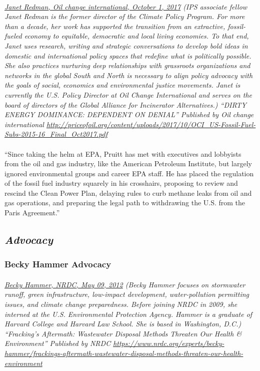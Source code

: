 \documentclass{article}
\begin{document}
\paragraph{}
\small
\textit{
\underline{Janet Redman, Oil change international, October 1, 2017}
(IPS associate fellow Janet Redman is the former director of the Climate Policy Program. For more than a decade, her work has supported the transition from an extractive, fossil-fueled economy to equitable, democratic and local living economies. To that end, Janet uses research, writing and strategic conversations to develop bold ideas in domestic and international policy spaces that redefine what is politically possible. She also practices nurturing deep relationships with grassroots organizations and networks in the global South and North is necessary to align policy advocacy with the goals of social, economics and environmental justice movements. Janet is currently the U.S. Policy Director at Oil Change International and serves on the board of directors of the Global Alliance for Incinerator Alternatives.) “DIRTY ENERGY DOMINANCE: DEPENDENT ON DENIAL” Published by Oil change international
\url{http://priceofoil.org/content/uploads/2017/10/OCI_US-Fossil-Fuel-Subs-2015-16_Final_Oct2017.pdf }}
\normalsize

\paragraph{}
``Since taking the helm at EPA, Pruitt has met with executives and lobbyists from the oil and gas industry, like the American Petroleum Institute, but largely ignored environmental groups and career EPA staff. He has placed the regulation of the fossil fuel industry squarely in his crosshairs, proposing to review and rescind the Clean Power Plan, delaying rules to curb methane leaks from oil and gas operations, and preparing the legal path to withdrawing the U.S. from the Paris Agreement.”

\subsection{\emph{Advocacy}}

\subsubsection{Becky Hammer Advocacy}
\paragraph{}
\small
\textit{
\underline{Becky Hammer, NRDC, May 09, 2012}
(Becky Hammer focuses on stormwater runoff, green infrastructure, low-impact development, water-pollution permitting issues, and climate change preparedness. Before joining NRDC in 2009, she interned at the U.S. Environmental Protection Agency. Hammer is a graduate of Harvard College and Harvard Law School. She is based in Washington, D.C.) “Fracking's Aftermath: Wastewater Disposal Methods Threaten Our Health \& Environment” Published by NRDC 
\url{https://www.nrdc.org/experts/becky-hammer/frackings-aftermath-wastewater-disposal-methods-threaten-our-health-environment}}
\normalsize
\end{document}
